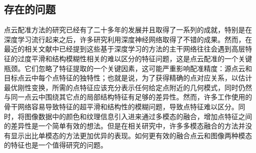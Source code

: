     \subsection{存在的问题}
    点云配准方法的研究已经有了二十多年的发展并且取得了一系列的成就，特别是在深度学习流行起来之后，许多研究利用深度神经网络取得了不错的成果。然而，在最近的相关文献\cite{Dope}中已经提到这些基于深度学习的方法的主干网络往往会遇到高层特征的过度平滑和结构模糊性相关的难以区分的特征问题，这是点云配准的一个关键瓶颈。它们忽略了特征提取的一个关键因素，这可能严重影响配准精度：源点云和目标点云中每个点特征的独特性；也就是说，为了获得精确的点对应关系，以估计最优刚性变换，所需的点特征应该充分表示任何给定点附近的几何模式，同时仍然与同一点云中围绕其它点的局部结构特征有足够的差异性。然而，许多工作使用的骨干网络容易导致特征的超平滑和结构性的模糊问题，导致点特征难以区分。同时，将图像数据中的颜色和纹理信息引入进来通过多模态的融合，增加点特征之间的差异性是一个简单有效的想法。但是在相关研究中，许多多模态融合的方法并没有显示出比单模态的方法更加优异的表现。如何更有效的融合点云和图像两种模态的特征也是一个值得研究的问题。

